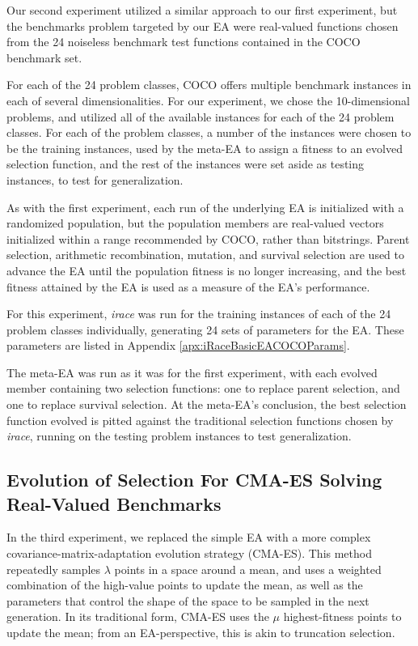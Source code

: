 \documentclass[sigconf]{acmart}
\begin{document}
Our second experiment utilized a similar approach to our first experiment, but the benchmarks problem targeted by our EA were real-valued functions chosen from the 24 noiseless benchmark test functions contained in the COCO benchmark set. 

For each of the 24 problem classes, COCO offers multiple benchmark instances in each of several dimensionalities. For our experiment, we chose the 10-dimensional problems, and utilized all of the available instances for each of the 24 problem classes. For each of the problem classes, a number of the instances were chosen to be the training instances, used by the meta-EA to assign a fitness to an evolved selection function, and the rest of the instances were set aside as testing instances, to test for generalization.

As with the first experiment, each run of the underlying EA is initialized with a randomized population, but the population members are real-valued vectors initialized within a range recommended by COCO, rather than bitstrings. Parent selection, arithmetic recombination, mutation, and survival selection are used to advance the EA until the population fitness is no longer increasing, and the best fitness attained by the EA is used as a measure of the EA's performance.

For this experiment, \textit{irace} was run for the training instances of each of the 24 problem classes individually, generating 24 sets of parameters for the EA. These parameters are listed in Appendix \ref{apx:iRaceBasicEACOCOParams}. 

The meta-EA was run as it was for the first experiment, with each evolved member containing two selection functions: one to replace parent selection, and one to replace survival selection. At the meta-EA's conclusion, the best selection function evolved is pitted against the traditional selection functions chosen by \textit{irace}, running on the testing problem instances to test generalization.

\subsection{Evolution of Selection For CMA-ES Solving Real-Valued Benchmarks}
\label{Evolution of Selection For CMA-ES Solving Real-Valued Benchmarks}

In the third experiment, we replaced the simple EA with a more complex covariance-matrix-adaptation evolution strategy (CMA-ES). This method repeatedly samples $\lambda$ points in a space around a mean, and uses a weighted combination of the high-value points to update the mean, as well as the parameters that control the shape of the space to be sampled in the next generation. In its traditional form, CMA-ES uses the $\mu$ highest-fitness points to update the mean; from an EA-perspective, this is akin to truncation selection. 
\end{document}

